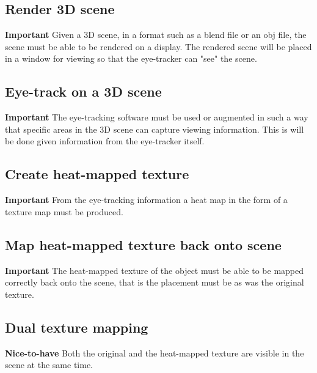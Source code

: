 \subsection{Render 3D scene}
    \textbf{Important}\newline
    Given a 3D scene, in a format such as a blend file or an obj file, the scene must be able to be rendered on a display. The rendered scene will be placed in a window for viewing so that the eye-tracker can "see" the scene.
\subsection{Eye-track on a 3D scene}
    \textbf{Important}\newline
    The eye-tracking software must be used or augmented in such a way that specific areas in the 3D scene can capture viewing information. This is will be done given information from the eye-tracker itself.
\subsection{Create heat-mapped texture}
    \textbf{Important}\newline
    From the eye-tracking information a heat map in the form of a texture map must be produced.
\subsection{Map heat-mapped texture back onto scene}
    \textbf{Important}\newline
    The heat-mapped texture of the object must be able to be mapped correctly back onto the scene, that is the placement must be as was the original texture.
\subsection{Dual texture mapping}
    \textbf{Nice-to-have}\newline
    Both the original and the heat-mapped texture are visible in the scene at the same time.

